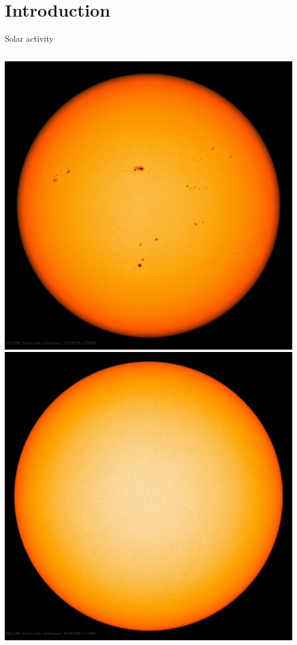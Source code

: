 \section{Introduction}

\begin{frame}[plain,c]{Solar activity}{}
	\begin{columns}[c]
		
		\includegraphics[width=0.96\textwidth]{../talk_figures/20130516_170000_1024_HMIIC.jpg}
		\pause
		\includegraphics[width=0.96\textwidth]{../talk_figures/latest_2048_HMIIC.jpg}
		

\end{columns}
\end{frame}
